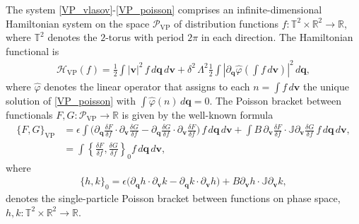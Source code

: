 \documentclass[%
 aip,
 amsmath,amssymb,
reprint, onecolumn %
]{revtex4-1}
\begin{document}
The system \eqref{VP_vlasov}-\eqref{VP_poisson} comprises an infinite-dimensional Hamiltonian system on the space $\mathcal{P}_{\text{VP}}$ of distribution functions $f:\mathbb{T}^2\times\mathbb{R}^2\rightarrow \mathbb{R}$, where $\mathbb{T}^2$ denotes the $2$-torus with period $2\pi$ in each direction. The Hamiltonian functional is
\begin{align}
\mathcal{H}_{\text{VP}}(f) = \frac{1}{2}\int |\bm{v}|^2\,f\,d\bm{q}\,d\bm{v} + \delta^2\,\Lambda^2\frac{1}{2}\int \left|\partial_{\bm{q}}\widehat{\varphi}\left(\int f\,d\bm{v}\right)\right|^2\,d\bm{q},\label{VP_hamiltonian}
\end{align}
where $\widehat{\varphi}$ denotes the linear operator that assigns to each $n = \int f\,d\bm{v}$ the unique solution of \eqref{VP_poisson} with $\int \widehat{\varphi}(n)\,d\bm{q} = 0$. The Poisson bracket between functionals $F,G:\mathcal{P}_{\text{VP}}\rightarrow\mathbb{R}$ is given by the well-known formula
\begin{align}
\{F,G\}_{\text{VP}} & = \epsilon\int \bigg(\partial_{\bm{q}}\frac{\delta F}{\delta f}\cdot \partial_{\bm{v}}\frac{\delta G}{\delta f} -\partial_{\bm{q}}\frac{\delta G}{\delta f}\cdot \partial_{\bm{v}}\frac{\delta F}{\delta f} \bigg)\,f\,d\bm{q}\,d\bm{v} + \int B\,\partial_{\bm{v}}\frac{\delta F}{\delta f}\cdot\mathbb{J}\partial_{\bm{v}}\frac{\delta G}{\delta f}\,f\,d\bm{q}\,d\bm{v},\nonumber\\
& = \int \left\{\frac{\delta F}{\delta f},\frac{\delta G}{\delta f}\right\}_0f\,d\bm{q}\,d\bm{v},
\end{align}
where
\begin{align*}
\{h,k\}_0 = \epsilon\bigg(\partial_{\bm{q}}h\cdot\partial_{\bm{v}}k - \partial_{\bm{q}}k\cdot\partial_{\bm{v}}h\bigg) + B\partial_{\bm{v}}h\cdot\mathbb{J}\partial_{\bm{v}}k,
\end{align*}
denotes the single-particle Poisson bracket between functions on phase space, $h,k:\mathbb{T}^2\times \mathbb{R}^2\rightarrow\mathbb{R}$.
\end{document}
